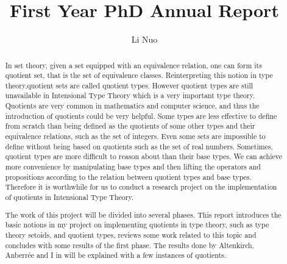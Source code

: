 \documentclass{article}
\author{Li Nuo}
\title{First Year PhD Annual Report}
\theoremstyle{definition}
\newcommand{\todo}[1]{\textcolor{red}{TO~DO:~#1}}
\newcommand{\itt}{Intensional Type Theory}
\begin{document}
\maketitle

\tableofcontents

\newpage

\begin{abstract}



In set theory, given a set equipped with an equivalence relation, one can form its
quotient set, that is the set of equivalence classes.
Reinterpreting this notion in type theory,quotient sets are called quotient types.
However quotient types are still
unavailable in \itt{} which is a very important type theory.
Quotients are very common in mathematics and computer science, and
thus the introduction of quotients could be very helpful.
Some types are less effective to define from scratch than being defined
as the quotients of some other types and their equivalence relations, such as the
set of integers.
Even some sets are impossible to define without being based on quotients such as the set of real
numbers.
Sometimes, quotient types are more difficult to reason about than
their base types. 
We can achieve more convenience by manipulating base types and then lifting the operators and propositions according to the relation between quotient types and base types.
Therefore it is worthwhile for us to conduct a research project on the
implementation of quotients in \itt{}.

The work of this project will be divided into several phases. This
report introduces the basic notions in my project on implementing
quotients in type theory, such as type theory setoids, and quotient
types, reviews some work related to this topic and concludes with some
results of the first phase. 
The results done by Altenkirch, Anberr\'{e}e and I in \cite{aan} will be explained with a
few instances of quotients.

\end{abstract}
\end{document}
